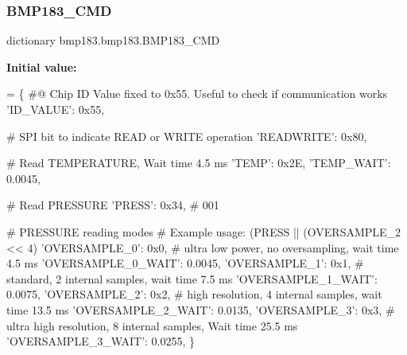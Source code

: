 \mbox{\label{classbmp183_1_1bmp183_adfc4b0a2ebdb9b408e1fe027c94aae30}} 
\subsubsection{\texorpdfstring{B\+M\+P183\+\_\+\+C\+MD}{BMP183\_CMD}}
{\footnotesize\ttfamily dictionary bmp183.\+bmp183.\+B\+M\+P183\+\_\+\+C\+MD\hspace{0.3cm}{\ttfamily [static]}}

{\bfseries Initial value\+:}
\begin{DoxyCode}
=  \{
        \textcolor{comment}{#@ Chip ID Value fixed to 0x55. Useful to check if communication works}
        \textcolor{stringliteral}{'ID\_VALUE'}: 0x55,

        \textcolor{comment}{# SPI bit to indicate READ or WRITE operation}
        \textcolor{stringliteral}{'READWRITE'}: 0x80,

        \textcolor{comment}{# Read TEMPERATURE, Wait time 4.5 ms}
        \textcolor{stringliteral}{'TEMP'}: 0x2E,
        \textcolor{stringliteral}{'TEMP\_WAIT'}: 0.0045,

        \textcolor{comment}{# Read PRESSURE}
        \textcolor{stringliteral}{'PRESS'}: 0x34,  \textcolor{comment}{# 001}

        \textcolor{comment}{# PRESSURE reading modes}
        \textcolor{comment}{# Example usage: (PRESS || (OVERSAMPLE\_2 << 4)}
        \textcolor{stringliteral}{'OVERSAMPLE\_0'}: 0x0,  \textcolor{comment}{# ultra low power, no oversampling, wait time 4.5 ms}
        \textcolor{stringliteral}{'OVERSAMPLE\_0\_WAIT'}: 0.0045,
        \textcolor{stringliteral}{'OVERSAMPLE\_1'}: 0x1,  \textcolor{comment}{# standard, 2 internal samples, wait time 7.5 ms}
        \textcolor{stringliteral}{'OVERSAMPLE\_1\_WAIT'}: 0.0075,
        \textcolor{stringliteral}{'OVERSAMPLE\_2'}: 0x2,  \textcolor{comment}{# high resolution, 4 internal samples, wait time 13.5 ms}
        \textcolor{stringliteral}{'OVERSAMPLE\_2\_WAIT'}: 0.0135,
        \textcolor{stringliteral}{'OVERSAMPLE\_3'}: 0x3,  \textcolor{comment}{# ultra high resolution, 8 internal samples, Wait time 25.5 ms}
        \textcolor{stringliteral}{'OVERSAMPLE\_3\_WAIT'}: 0.0255,
    \}
\end{DoxyCode}
\mbox{\label{classbmp183_1_1bmp183_ab907f6f3c1aef0a95df7f653c613f79f}} 
